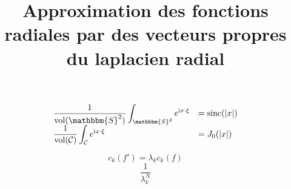 \documentclass[11pt,a4paper]{article}
\title{Approximation des fonctions radiales par des vecteurs propres du laplacien radial}
\begin{document}
\renewcommand{\proofname}{Preuve}
\maketitle
\theoremstyle{plain}
\newtheorem{The}{Théorème}[section]
\newtheorem{Prop}{Proposition}[section]
\newtheorem{Cor}{Corollaire}[section]
\theoremstyle{definition}
\newtheorem{Def}{Définition}[section]
\newcommand{\enstq}[2]{\left\{#1\mathrel{}\middle|\mathrel{}#2\right\}}
\newcommand{\Lp}[2]{L^#1(#2)}
\newcommand{\Sob}[3]{W^{#1,#2}(#3)}
\newcommand{\RN}[0]{\mathbb{R}^N}
\newcommand{\norm}[1]{\left\|#1\right\|}
\newcommand{\sinc}[0]{\textup{sinc}}
\newcommand{\functionDef}[5]{\begin{array}{lllll}
#1 & : & #2 & \longrightarrow & #3 \\
 & & #4 & \longmapsto &\displaystyle #5 \\
\end{array}}
\renewcommand{\i}{\mathrm{i}}
\newcommand{\SN}[1]{\mathbbm{S}^{#1}}


\[\begin{array}{ll}
\displaystyle 
\frac{1}{\text{vol}(\SN{2})}\displaystyle \int_{\SN{2}} e^{\i x\cdot \xi } & = \sinc(|x|)\\
\displaystyle \displaystyle \frac{1}{\text{vol}(\mathcal{C})}\int_{\mathcal{C}} e^{\i x\cdot \xi } & = J_0(|x|)\\
\end{array} \]

\[c_k(f') = \lambda_k c_k(f)\]
\[\frac{1}{\lambda_k^N} \]
\end{document}
